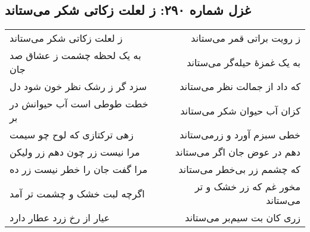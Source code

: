 \begin{center}
\section*{غزل شماره ۲۹۰: ز لعلت زکاتی شکر می‌ستاند}
\label{sec:290}
\begin{longtable}{l p{0.5cm} r}
ز لعلت زکاتی شکر می‌ستاند
&&
ز رویت براتی قمر می‌ستاند
\\
به یک لحظه چشمت ز عشاق صد جان
&&
به یک غمزهٔ حیله‌گر می‌ستاند
\\
سزد گر ز رشک نظر خون شود دل
&&
که داد از جمالت نظر می‌ستاند
\\
خطت طوطی است آب حیوانش در بر
&&
کزان آب حیوان شکر می‌ستاند
\\
زهی ترکتازی که لوح چو سیمت
&&
خطی سبزم آورد و زرمی‌ستاند
\\
مرا نیست زر چون دهم زر ولیکن
&&
دهم در عوض جان اگر می‌ستاند
\\
مرا گفت جان را خطر نیست زر ده
&&
که چشمم زر بی‌خطر می‌ستاند
\\
اگرچه لبت خشک و چشمت تر آمد
&&
مخور غم که زر خشک و تر می‌ستاند
\\
عیار از رخ زرد عطار دارد
&&
زری کان بت سیم‌بر می‌ستاند
\\
\end{longtable}
\end{center}
